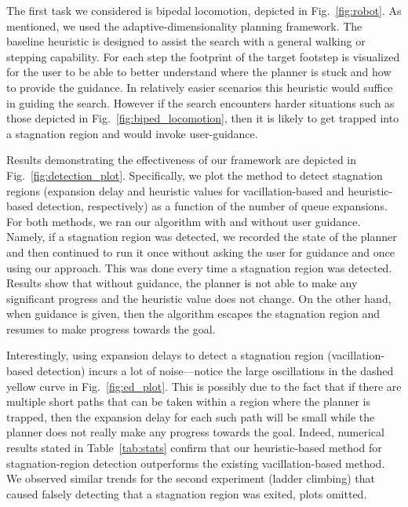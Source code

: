 \documentclass{article}
\begin{document}

The first task we considered is bipedal locomotion, depicted in Fig.~\ref{fig:robot}.
As mentioned, we used the adaptive-dimensionality  planning framework. The baseline heuristic is designed to assist the search with a general walking or stepping capability. For each step the footprint of the target footstep is visualized for the user to be able to better understand where the planner is stuck and how to provide the guidance. In relatively easier scenarios this heuristic would suffice in guiding the search. However if the search encounters harder situations such as those depicted in Fig.~\ref{fig:biped_locomotion}, then it is likely to get trapped into a stagnation region and would invoke user-guidance.

Results demonstrating the effectiveness of our framework are depicted in Fig.~\ref{fig:detection_plot}.
Specifically, we plot the 
method to detect stagnation regions (expansion delay and heuristic values for vacillation-based and heuristic-based detection, respectively) as a function of the number of queue expansions.
For both methods, we ran our algorithm with and without user guidance.
Namely, if a stagnation region was detected, we recorded the state of the planner and then continued to run it once without asking the user for guidance and once using our approach. This was done every time a stagnation region was detected. 
Results show that without guidance, the planner is not able to make any significant progress and the heuristic value does not change.
On the other hand, when guidance is given, then the algorithm escapes the stagnation region and resumes to make progress towards the goal.

Interestingly, using expansion delays to detect a stagnation region (vacillation-based detection) incurs a lot of noise---notice the large oscillations in the dashed yellow curve in Fig.~\ref{fig:ed_plot}. 
This is possibly due to the fact that if there are multiple short paths that can be taken within a region where the planner is trapped, then the expansion delay for each such path will be small while the planner does not really make any progress towards the goal.
Indeed, numerical results stated in Table~\ref{tab:stats} confirm that our heuristic-based method for stagnation-region detection outperforms the existing  vacillation-based method.
We observed similar trends for the second experiment (ladder climbing) that caused falsely detecting that a stagnation region was exited, plots omitted.
\end{document}
